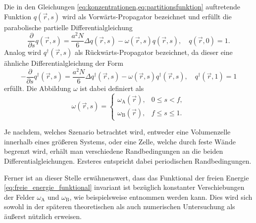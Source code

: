 \documentclass[../main.tex]{subfiles}
\begin{document}
Die in den Gleichungen \cref{eq:konzentrationen,eq:partitionsfunktion} auftretende Funktion $q(\vec{r}, s)$ wird als Vorwärts-Propagator bezeichnet und erfüllt die parabolische partielle Differentialgleichung
\begin{equation}
\label{eq:forward_propagator}
        \frac{\partial}{\partial s} q(\vec{r}, s) = \frac{a^{2}N}{6} \Delta q(\vec{r}, s) - \omega(\vec{r}, s) q(\vec{r}, s), \quad
    q(\vec{r}, 0) = 1.
\end{equation}
Analog wird $q^{\dagger}(\vec{r}, s)$ als Rückwärts-Propagator bezeichnet, da dieser eine ähnliche Differentialgleichung der Form
\begin{equation}
\label{eq:backward_propagator}
        -\frac{\partial}{\partial s}q^{\dagger}(\vec{r}, s) = \frac{a^{2}N}{6} \Delta q^{\dagger}(\vec{r}, s) - \omega(\vec{r}, s) q^{\dagger}(\vec{r}, s), \quad
    q^{\dagger}(\vec{r}, 1) = 1
\end{equation}%
erfüllt.
Die Abbildung $\omega$ ist dabei definiert als
\begin{equation}
    \omega(\vec{r}, s) = \begin{cases}
        \omega_{\mathrm{A}}(\vec{r}), & 0 \leq s < f,\\
        \omega_{\mathrm{B}}(\vec{r}), & f \leq s \leq 1.
    \end{cases}
\end{equation}


Je nachdem, welches Szenario betrachtet wird, entweder eine Volumenzelle innerhalb eines größeren Systems, oder eine Zelle, welche durch feste Wände begrenzt wird, erhält man verschiedene Randbedingungen an die beiden Differentialgleichungen.
Ersteres entspricht dabei periodischen Randbedingungen.

Ferner ist an dieser Stelle erwähnenswert, dass das Funktional der freien Energie \cref{eq:freie_energie_funktional} invariant ist bezüglich konstanter Verschiebungen der Felder $\omega_{\mathrm{A}}$ und $\omega_{\mathrm{B}}$, wie beispielsweise \cite{Ceniceros:2006is} entnommen werden kann.
Dies wird sich sowohl in der späteren theoretischen als auch numerischen Untersuchung als äußerst nützlich erweisen.
\end{document}
